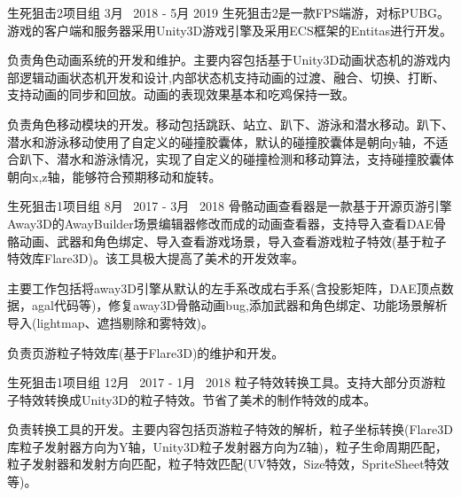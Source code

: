 \begin{cventries}
\cventryproject
{生死狙击2项目组} %
{3月~ 2018 - 5月 2019} %
{生死狙击2是一款FPS端游，对标PUBG。游戏的客户端和服务器采用Unity3D游戏引擎及采用ECS框架的Entitas进行开发。}
{ %
\begin{cvitems}
\item {负责角色动画系统的开发和维护。主要内容包括基于Unity3D动画状态机的游戏内部逻辑动画状态机开发和设计,内部状态机支持动画的过渡、融合、切换、打断、支持动画的同步和回放。动画的表现效果基本和吃鸡保持一致。}
\item{负责角色移动模块的开发。移动包括跳跃、站立、趴下、游泳和潜水移动。趴下、潜水和游泳移动使用了自定义的碰撞胶囊体，默认的碰撞胶囊体是朝向y轴，不适合趴下、潜水和游泳情况，实现了自定义的碰撞检测和移动算法，支持碰撞胶囊体朝向x,z轴，能够符合预期移动和旋转。}
\end{cvitems}
}

\cventryproject
{生死狙击1项目组} %
{8月~ 2017 - 3月~ 2018} %
{骨骼动画查看器是一款基于开源页游引擎Away3D的AwayBuilder场景编辑器修改而成的动画查看器，支持导入查看DAE骨骼动画、武器和角色绑定、导入查看游戏场景，导入查看游戏粒子特效(基于粒子特效库Flare3D)。该工具极大提高了美术的开发效率。}
{ %
	\begin{cvitems}
		\item {主要工作包括将away3D引擎从默认的左手系改成右手系(含投影矩阵，DAE顶点数据，agal代码等)，修复away3D骨骼动画bug,添加武器和角色绑定、功能场景解析导入(lightmap、遮挡剔除和雾特效)。}
		\item {负责页游粒子特效库(基于Flare3D)的维护和开发。}
	\end{cvitems}
}
\cventryproject
{生死狙击1项目组} %
{12月~ 2017 - 1月~ 2018} %
{粒子特效转换工具。支持大部分页游粒子特效转换成Unity3D的粒子特效。节省了美术的制作特效的成本。}
{ %
	\begin{cvitems}
		\item {负责转换工具的开发。主要内容包括页游粒子特效的解析，粒子坐标转换(Flare3D库粒子发射器方向为Y轴，Unity3D粒子发射器方向为Z轴)，粒子生命周期匹配，粒子发射器和发射方向匹配，粒子特效匹配(UV特效，Size特效，SpriteSheet特效等)。}
	\end{cvitems}
}



\end{cventries}

